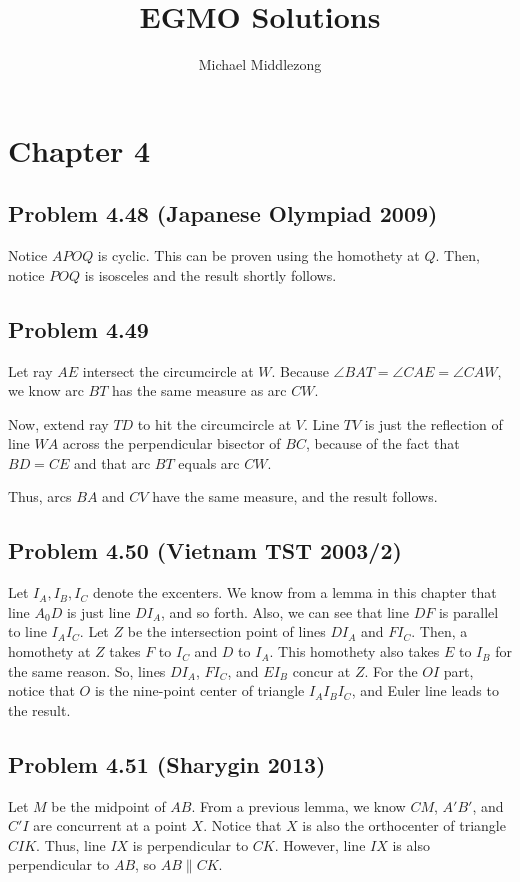 \documentclass{scrartcl}
\title{EGMO Solutions}
\author{Michael Middlezong}
\begin{document}
\setlength{\parskip}{1ex plus 0.5ex minus 0.2ex}

\maketitle

\section*{Chapter 4}
\subsection*{Problem 4.48 (Japanese Olympiad 2009)}
Notice $APOQ$ is cyclic. This can be proven using the homothety at $Q$. Then, notice $POQ$ is isosceles and the result shortly follows.
\subsection*{Problem 4.49}
Let ray $AE$ intersect the circumcircle at $W$. Because $\angle BAT = \angle CAE = \angle CAW$, we know arc $BT$ has the same measure as arc $CW$.

Now, extend ray $TD$ to hit the circumcircle at $V$. Line $TV$ is just the reflection of line $WA$ across the perpendicular bisector of $BC$, because of the fact that $BD = CE$ and that arc $BT$ equals arc $CW$.

Thus, arcs $BA$ and $CV$ have the same measure, and the result follows.
\subsection*{Problem 4.50 (Vietnam TST 2003/2)}
Let $I_A, I_B, I_C$ denote the excenters.
We know from a lemma in this chapter that line $A_0D$ is just line $DI_A$, and so forth. Also, we can see that line $DF$ is parallel to line $I_AI_C$. Let $Z$ be the intersection point of lines $DI_A$ and $FI_C$. Then, a homothety at $Z$ takes $F$ to $I_C$ and $D$ to $I_A$. This homothety also takes $E$ to $I_B$ for the same reason. So, lines $DI_A$, $FI_C$, and $EI_B$ concur at $Z$. For the $OI$ part, notice that $O$ is the nine-point center of triangle $I_AI_BI_C$, and Euler line leads to the result.
\subsection*{Problem 4.51 (Sharygin 2013)}
Let $M$ be the midpoint of $AB$. From a previous lemma, we know $CM$, $A'B'$, and $C'I$ are concurrent at a point $X$. Notice that $X$ is also the orthocenter of triangle $CIK$. Thus, line $IX$ is perpendicular to $CK$. However, line $IX$ is also perpendicular to $AB$, so $AB \parallel CK$.
\end{document}
